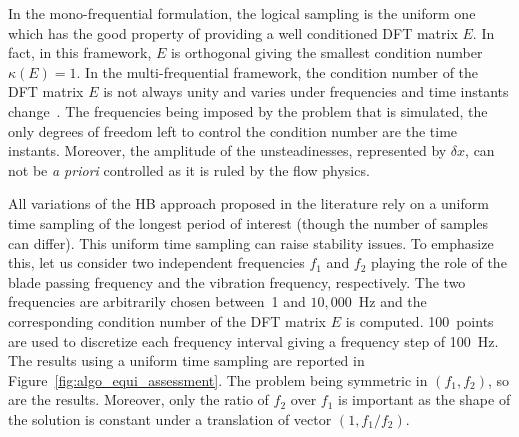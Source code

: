 In the mono-frequential formulation, the logical sampling is the uniform one
which has the good property of providing
a well conditioned DFT matrix $E$. In fact, in this framework, $E$ is orthogonal giving 
the smallest condition number $\kappa (E) = 1$.
In the multi-frequential framework,
the condition number of the DFT matrix $E$ is not always unity and
varies under frequencies and time instants change~\cite{Kundert1988}. 
The frequencies
being imposed by the problem that is simulated,
the only degrees of freedom left to control the condition
number are the time instants. 
Moreover, the amplitude of the unsteadinesses, represented by $\delta x$,
can not be \emph{a priori} controlled as it is ruled by the flow physics. 

All variations of the HB approach proposed in the literature rely on 
a uniform time sampling of the longest period of interest 
(though the number of samples can differ). 
This uniform time sampling can raise stability issues.
To emphasize this, let us consider two independent frequencies $f_1$
and $f_2$ playing the role of the blade passing frequency and
the vibration frequency, respectively. 
The two frequencies are arbitrarily chosen between~1
and $10,000$~Hz and the corresponding
condition number of the DFT matrix $E$ is computed. 
100~points are used to discretize each 
frequency interval giving a frequency step of 100~Hz.
The results using a uniform time
sampling are reported in Figure~\ref{fig:algo_equi_assessment}.
The problem being symmetric in $(f_1, f_2)$, so are the results.
Moreover, only the
ratio of $f_2$ over $f_1$ is important as the shape of the
solution is constant under a translation of vector $(1,f_1 / f_2)$.

